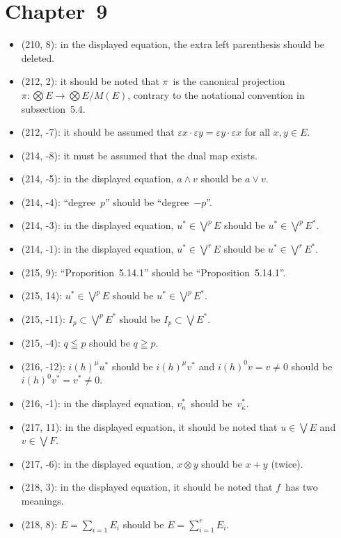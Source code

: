 \documentclass[letterpaper,12pt]{article}
\newcommand{\mult}{\cdot}
\newcommand{\tprod}{\otimes}
\newcommand{\bigtprod}{\bigotimes}
\newcommand{\eprod}{\wedge}
\newcommand{\smprod}{\vee}
\newcommand{\bigsmprod}{\bigvee}
\begin{document}
\section*{Chapter~9}
\begin{itemize}
\item (210, 8): in the displayed equation, the extra left parenthesis should be deleted.
\item (212, 2): it should be noted that \(\pi\)~is the canonical projection \(\pi:\bigtprod E\to\bigtprod E/M(E)\), contrary to the notational convention in subsection~5.4.
\item (212, -7): it should be assumed that \(\varepsilon x\mult\varepsilon y=\varepsilon y\mult\varepsilon x\) for all \(x,y\in E\).
\item (214, -8): it must be assumed that the dual map exists.
\item (214, -5): in the displayed equation, \(a\eprod v\) should be \(a\smprod v\).
\item (214, -4): ``degree~\(p\)'' should be ``degree~\(-p\)''.
\item (214, -3): in the displayed equation, \(u^*\in\bigsmprod^p E\) should be \(u^*\in\bigsmprod^p E^*\).
\item (214, -1): in the displayed equation, \(u^*\in\bigsmprod^r E\) should be \(u^*\in\bigsmprod^r E^*\).
\item (215, 9): ``Proporition~5.14.1'' should be ``Proposition~5.14.1''.
\item (215, 14): \(u^*\in\bigsmprod^p E\) should be \(u^*\in\bigsmprod^p E^*\).
\item (215, -11): \(I_p\subset\bigsmprod^p E^*\) should be \(I_p\subset\bigsmprod E^*\).
\item (215, -4): \(q\leqq p\) should be \(q\geqq p\).
\item (216, -12): \(i(h)^{\mu}u^*\) should be \(i(h)^{\mu}v^*\) and \(i(h)^0v=v\ne0\) should be \(i(h)^0v^*=v^*\ne0\).
\item (216, -1): in the displayed equation, \(v^*_n\)~should be~\(v^*_{\kappa}\).
\item (217, 11): in the displayed equation, it should be noted that \(u\in\bigsmprod E\) and \(v\in\bigsmprod F\).
\item (217, -6): in the displayed equation, \(x\tprod y\) should be \(x+y\) (twice).
\item (218, 3): in the displayed equation, it should be noted that \(f\)~has two meanings.
\item (218, 8): \(E=\sum_{i=1}E_i\) should be \(E=\sum_{i=1}^rE_i\).

\end{itemize}
\end{document}
